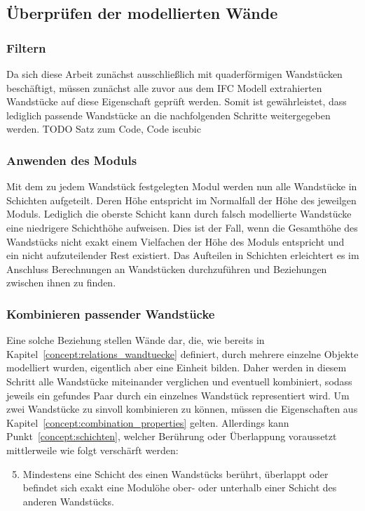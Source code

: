 \subsection{Überprüfen der modellierten Wände}
\subsubsection{Filtern}
Da sich diese Arbeit zunächst ausschließlich mit quaderförmigen Wandstücken beschäftigt, müssen zunächst alle zuvor aus dem IFC Modell extrahierten Wandstücke auf diese Eigenschaft geprüft werden.
Somit ist gewährleistet, dass lediglich passende Wandstücke an die nachfolgenden Schritte weitergegeben werden.
TODO Satz zum Code, Code iscubic

\subsubsection{Anwenden des Moduls}
Mit dem zu jedem Wandstück festgelegten Modul werden nun alle Wandstücke in Schichten aufgeteilt.
Deren Höhe entspricht im Normalfall der Höhe des jeweilgen Moduls.
Lediglich die oberste Schicht kann durch falsch modellierte Wandstücke eine niedrigere Schichthöhe aufweisen.
Dies ist der Fall, wenn die Gesamthöhe des Wandstücks nicht exakt einem Vielfachen der Höhe des Moduls entspricht und ein nicht aufzuteilender Rest existiert.
Das Aufteilen in Schichten erleichtert es im Anschluss Berechnungen an Wandstücken durchzuführen und Beziehungen zwischen ihnen zu finden.

\subsubsection{Kombinieren passender Wandstücke}
\label{real:combination}
Eine solche Beziehung stellen Wände dar, die, wie bereits in Kapitel~\ref{concept:relations_wandtuecke} definiert, durch mehrere einzelne Objekte modelliert wurden, eigentlich aber eine Einheit bilden.
Daher werden in diesem Schritt alle Wandstücke miteinander verglichen und eventuell kombiniert, sodass jeweils ein gefundes Paar durch ein einzelnes Wandstück representiert wird.
Um zwei Wandstücke zu sinvoll kombinieren zu können, müssen die Eigenschaften aus Kapitel~\ref{concept:combination_properties} gelten.
Allerdings kann Punkt~\ref{concept:schichten}, welcher Berührung oder Überlappung voraussetzt mittlerweile wie folgt verschärft werden:

\begin{enumerate}
\setcounter{enumi}{4}
\item\label{real:schichten} Mindestens eine Schicht des einen Wandstücks berührt, überlappt oder befindet sich exakt eine Modulöhe ober- oder unterhalb einer Schicht des anderen Wandstücks.
\end{enumerate}

